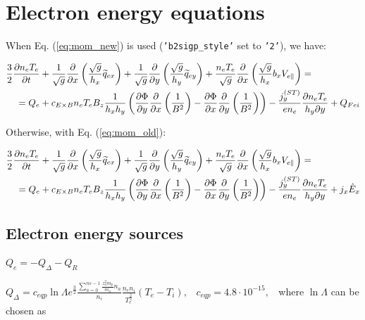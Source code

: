 \documentclass[a4paper,10pt]{report}
\begin{document}
\section{Electron energy equations}

When Eq. (\ref{eq:mom_new}) is used ({\tt 'b2sigp\_style'} set to {\tt '2'}), we have:

\begin{align}
\frac 3 2 \frac{\partial n_e T_e}{\partial t} &+
\frac 1{\sqrt g} \frac{\partial }{\partial x} \left( \frac{\sqrt g}{h_x} \widetilde{q}_{ex} \right) +
\frac 1{\sqrt g} \frac{\partial }{\partial y} \left( \frac{\sqrt g}{h_y} \widetilde{q}_{ey} \right) +
\frac{n_e T_e}{\sqrt g} \frac{\partial}{\partial x} \left(\frac{\sqrt g}{h_x} b_x V_{e \parallel} \right) = \notag \\
= Q_e &+ c_{E\times B} n_e T_e B_z \frac 1{h_x h_y}
\left(
	\frac{\partial \Phi }{\partial y} \frac{\partial }{\partial x} \left(\frac 1{B^2} \right) -
	\frac{\partial \Phi }{\partial x} \frac{\partial }{\partial y} \left(\frac 1{B^2} \right)
\right)
-
\frac{j_y^{(ST)}}{e n_e} \frac{\partial n_e T_e}{h_y \partial y}
+ Q_{Fei}
\end{align}

Otherwise, with Eq. (\ref{eq:mom_old}):

\begin{align}
\frac 3 2 \frac{\partial n_e T_e}{\partial t} &+
\frac 1{\sqrt g} \frac{\partial }{\partial x} \left( \frac{\sqrt g}{h_x} \widetilde{q}_{ex} \right) +
\frac 1{\sqrt g} \frac{\partial }{\partial y} \left( \frac{\sqrt g}{h_y} \widetilde{q}_{ey} \right) +
\frac{n_e T_e}{\sqrt g} \frac{\partial}{\partial x} \left(\frac{\sqrt g}{h_x} b_x V_{e \parallel} \right) = \notag \\
= Q_e &+ c_{E\times B} n_e T_e B_z \frac 1{h_x h_y}
\left(
	\frac{\partial \Phi }{\partial y} \frac{\partial }{\partial x} \left(\frac 1{B^2} \right) -
	\frac{\partial \Phi }{\partial x} \frac{\partial }{\partial y} \left(\frac 1{B^2} \right)
\right)
-
\frac{j_y^{(ST)}}{e n_e} \frac{\partial n_e T_e}{h_y \partial y}
+ j_x \hat E_x
\end{align}

\subsection{Electron energy sources}

$Q_e = -Q_{\Delta } - Q_R$

$Q_{\Delta} = c_{eqp} \ln \Lambda e^{\frac 3 2}
\frac{
	\sum \limits_{a=0}^{ns-1}\frac{z_a^2 m_p}{m_a}n_a
	}
	{n_i}
\frac{n_e n_i}{T_e^{\frac 3 2}}
(T_e - T_i),\;\;\; c_{eqp}=4.8 \cdot 10^{-15},\;\;$ where $\ln \Lambda $ can be chosen as
\end{document}

